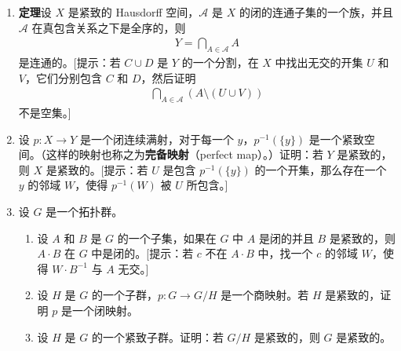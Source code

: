 \begin{enumerate}
(b) 举例说明，如果去掉 $X$ 是紧致的这个条件，或去掉序列是单调的这个条件，则定理不成立。[提示：见第 21 节习题。]
\item \textbf{定理}\quad 设 $X$ 是紧致的 Hausdorff 空间，$\mathcal{A}$ 是 $X$ 的闭的连通子集的一个族，并且 $\mathcal{A}$ 在真包含关系之下是全序的，则
\begin{align*}
Y=\bigcap_{A\in\mathcal{A}}A
\end{align*}
是连通的。[提示：若 $C\cup D$ 是 $Y$ 的一个分割，在 $X$ 中找出无交的开集 $U$ 和 $V$，它们分别包含 $C$ 和 $D$，然后证明
\begin{align*}
\bigcap_{A\in\mathcal{A}}(A\setminus(U\cup V))
\end{align*}
不是空集。]
\item 设 $p\colon X\to Y$ 是一个闭连续满射，对于每一个 $y$，$p^{-1}(\{y\})$ 是一个紧致空间。（这样的映射也称之为\textbf{完备映射}（perfect map）。）证明：若 $Y$ 是紧致的，则 $X$ 是紧致的。[提示：若 $U$ 是包含 $p^{-1}(\{y\})$ 的一个开集，那么存在一个 $y$ 的邻域 $W$，使得 $p^{-1}(W)$ 被 $U$ 所包含。]
\item 设 $G$ 是一个拓扑群。
\begin{enumerate}
\item 设 $A$ 和 $B$ 是 $G$ 的一个子集，如果在 $G$ 中 $A$ 是闭的并且 $B$ 是紧致的，则 $A\cdot B$ 在 $G$ 中是闭的。[提示：若 $c$ 不在 $A\cdot B$ 中，找一个 $c$ 的邻域 $W$，使得 $W\cdot B^{-1}$ 与 $A$ 无交。]
\item 设 $H$ 是 $G$ 的一个子群，$p\colon G\to G/H$ 是一个商映射。若 $H$ 是紧致的，证明 $p$ 是一个闭映射。
\item 设 $H$ 是 $G$ 的一个紧致子群。证明：若 $G/H$ 是紧致的，则 $G$ 是紧致的。
\end{enumerate}
\end{enumerate}